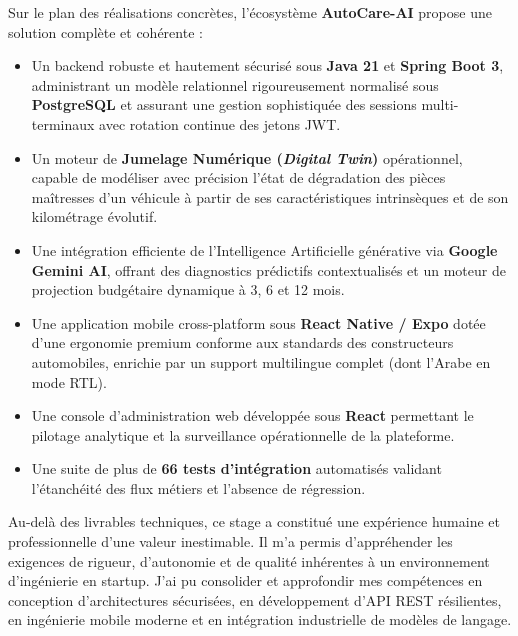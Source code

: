 \documentclass[12pt,a4paper,twoside,openright]{report}
\newcommand{\itembullet}{\textcolor{secondaryBlue}{$\blacktriangleright$}}
\begin{document}
  Sur le plan des r\'ealisations concr\`etes, l'\'ecosyst\`eme \textbf{AutoCare-AI} propose une solution compl\`ete et coh\'erente :
  \begin{itemize}[label=\itembullet]
    \item Un backend robuste et hautement s\'ecuris\'e sous \textbf{Java 21} et \textbf{Spring Boot 3}, administrant un mod\`ele relationnel rigoureusement normalis\'e sous \textbf{PostgreSQL} et assurant une gestion sophistiqu\'ee des sessions multi-terminaux avec rotation continue des jetons JWT.
    \item Un moteur de \textbf{Jumelage Num\'erique (\textit{Digital Twin})} op\'erationnel, capable de mod\'eliser avec pr\'ecision l'\'etat de d\'egradation des pi\`eces ma\^itresses d'un v\'ehicule \`a partir de ses caract\'eristiques intrins\`eques et de son kilom\'etrage \'evolutif.
    \item Une int\'egration efficiente de l'Intelligence Artificielle g\'en\'erative via \textbf{Google Gemini AI}, offrant des diagnostics pr\'edictifs contextualis\'es et un moteur de projection budg\'etaire dynamique \`a 3, 6 et 12 mois.
    \item Une application mobile cross-platform sous \textbf{React Native / Expo} dot\'ee d'une ergonomie premium conforme aux standards des constructeurs automobiles, enrichie par un support multilingue complet (dont l'Arabe en mode RTL).
    \item Une console d'administration web d\'evelopp\'ee sous \textbf{React} permettant le pilotage analytique et la surveillance op\'erationnelle de la plateforme.
    \item Une suite de plus de \textbf{66 tests d'int\'egration} automatis\'es validant l'\'etanch\'eit\'e des flux m\'etiers et l'absence de r\'egression.
  \end{itemize}

  Au-del\`a des livrables techniques, ce stage a constitu\'e une exp\'erience humaine et professionnelle d'une valeur inestimable. Il m'a permis d'appr\'ehender les exigences de rigueur, d'autonomie et de qualit\'e inh\'erentes \`a un environnement d'ing\'enierie en startup. J'ai pu consolider et approfondir mes comp\'etences en conception d'architectures s\'ecuris\'ees, en d\'eveloppement d'API REST r\'esilientes, en ing\'enierie mobile moderne et en int\'egration industrielle de mod\`eles de langage.
\end{document}
